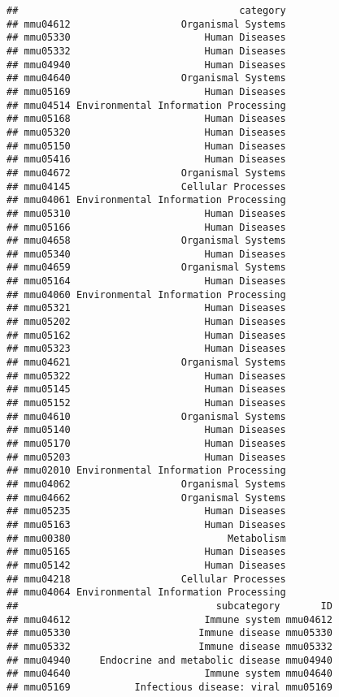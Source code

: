 \documentclass[
]{article}
\begin{document}
\begin{verbatim}
##                                      category
## mmu04612                   Organismal Systems
## mmu05330                       Human Diseases
## mmu05332                       Human Diseases
## mmu04940                       Human Diseases
## mmu04640                   Organismal Systems
## mmu05169                       Human Diseases
## mmu04514 Environmental Information Processing
## mmu05168                       Human Diseases
## mmu05320                       Human Diseases
## mmu05150                       Human Diseases
## mmu05416                       Human Diseases
## mmu04672                   Organismal Systems
## mmu04145                   Cellular Processes
## mmu04061 Environmental Information Processing
## mmu05310                       Human Diseases
## mmu05166                       Human Diseases
## mmu04658                   Organismal Systems
## mmu05340                       Human Diseases
## mmu04659                   Organismal Systems
## mmu05164                       Human Diseases
## mmu04060 Environmental Information Processing
## mmu05321                       Human Diseases
## mmu05202                       Human Diseases
## mmu05162                       Human Diseases
## mmu05323                       Human Diseases
## mmu04621                   Organismal Systems
## mmu05322                       Human Diseases
## mmu05145                       Human Diseases
## mmu05152                       Human Diseases
## mmu04610                   Organismal Systems
## mmu05140                       Human Diseases
## mmu05170                       Human Diseases
## mmu05203                       Human Diseases
## mmu02010 Environmental Information Processing
## mmu04062                   Organismal Systems
## mmu04662                   Organismal Systems
## mmu05235                       Human Diseases
## mmu05163                       Human Diseases
## mmu00380                           Metabolism
## mmu05165                       Human Diseases
## mmu05142                       Human Diseases
## mmu04218                   Cellular Processes
## mmu04064 Environmental Information Processing
##                                  subcategory       ID
## mmu04612                       Immune system mmu04612
## mmu05330                      Immune disease mmu05330
## mmu05332                      Immune disease mmu05332
## mmu04940     Endocrine and metabolic disease mmu04940
## mmu04640                       Immune system mmu04640
## mmu05169           Infectious disease: viral mmu05169

\end{verbatim}
\end{document}
